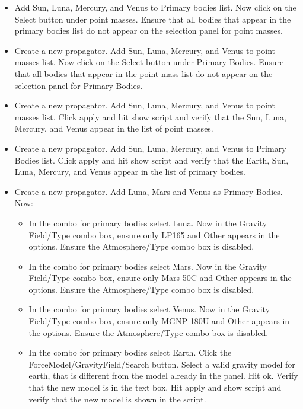 \begin{itemize}
    \item Add Sun, Luna, Mercury, and Venus to Primary bodies list.  Now
    click on the Select button under point masses.  Ensure that all
    bodies that appear in the primary bodies list do not appear
    on the selection panel for point masses.
    \item Create a new propagator.  Add Sun, Luna, Mercury, and Venus to point masses list.  Now
    click on the Select button under Primary Bodies.  Ensure that all
    bodies that appear in the point mass list do not appear
    on the selection panel for Primary Bodies.
    \item Create a new propagator.  Add Sun, Luna, Mercury, and Venus to point masses
    list.  Click apply and hit show script and verify that the
    Sun, Luna, Mercury, and Venus appear in the list of
    point masses.
    \item Create a new propagator.  Add Sun, Luna, Mercury, and Venus
    to Primary Bodies list.  Click apply and hit show script and verify that the
    Earth, Sun, Luna, Mercury, and Venus appear in the list of
    primary bodies.
    \item Create a new propagator.  Add Luna, Mars and Venus as Primary Bodies. Now:

    \begin{itemize}
    \item  In the combo for primary bodies select Luna.  Now in the
    Gravity Field/Type combo box, ensure only LP165 and Other appears in
    the options.  Ensure the Atmosphere/Type combo box is
    disabled.
    \item  In the combo for primary bodies select Mars.  Now in the
    Gravity Field/Type combo box, ensure only Mars-50C and Other appears in
    the options. Ensure the Atmosphere/Type combo box is
    disabled.
    \item  In the combo for primary bodies select Venus.  Now in the
    Gravity Field/Type combo box, ensure only MGNP-180U and Other appears in
    the options. Ensure the Atmosphere/Type combo box is
    disabled.
    \item In the combo for primary bodies select Earth. Click the ForceModel/GravityField/Search button.  Select a
    valid gravity model for earth, that is different from the model already in the panel.  Hit
    ok. Verify that the new model is in the text box.  Hit apply and
    show script and verify that the new model is shown in the
    script.
    \end{itemize}

\end{itemize}
